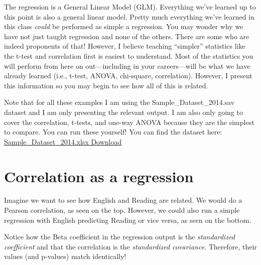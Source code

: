\documentclass[
]{book}
\begin{document}
The regression is a General Linear Model (GLM). Everything we've learned up to this point is also a general linear model. Pretty much everything we've learned in this class \emph{could} be performed as simple a regression. You may wonder why we have not just taught regression and none of the others. There are some who are indeed proponents of that! However, I believe teaching ``simpler'' statistics like the t-test and correlation first is easiest to understand. Most of the statistics you will perform from here on out---including in your careers---will be what we have already learned (i.e., t-test, ANOVA, chi-square, correlation). However, I present this information so you may begin to see how all of this is related.

Note that for all these examples I am using the Sample\_Dataset\_2014.sav dataset and I am only presenting the relevant output. I am also only going to cover the correlation, t-tests, and one-way ANOVA because they are the simplest to compare. You can run these yourself! You can find the dataset here: \href{https://github.com/danawanzer/stats-with-jamovi/blob/master/data/Sample_Dataset_2014.xlsx}{Sample\_Dataset\_2014.xlsx Download}

\hypertarget{correlation-as-a-regression}{%
\section{Correlation as a regression}\label{correlation-as-a-regression}}

Imagine we want to see how English and Reading are related. We would do a Pearson correlation, as seen on the top. However, we could also run a simple regression with English predicting Reading or vice versa, as seen on the bottom.

Notice how the Beta coefficient in the regression output is the \emph{standardized coefficient} and that the correlation is the \emph{standardized covariance}. Therefore, their values (and p-values) match identically!
\end{document}
